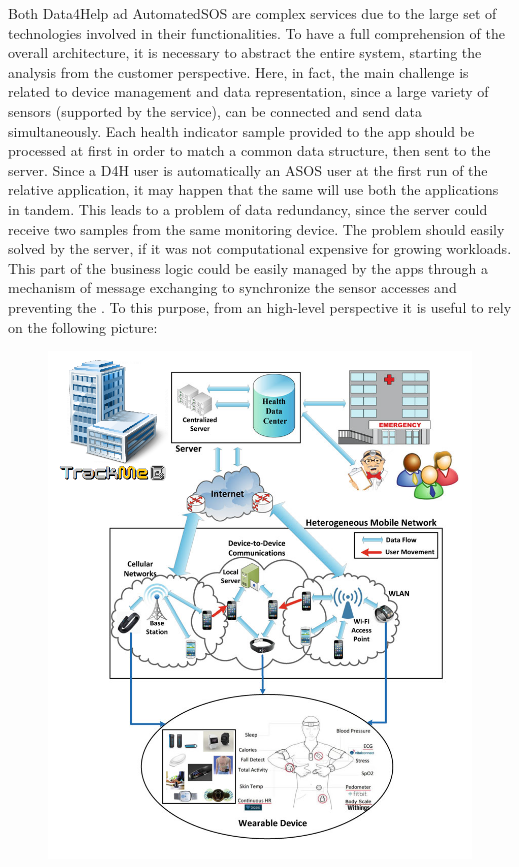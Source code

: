 

\begin{flushleft}

	
{}
Both Data4Help ad AutomatedSOS are complex services due to the large set of technologies involved in their functionalities. To have a full comprehension of the overall architecture, it is necessary to abstract the entire system, starting the analysis from the customer perspective. Here, in fact, the main challenge is related to device management and data representation, since a large variety of sensors (supported by the service), can be connected and send data simultaneously. Each health indicator sample provided to the app should be processed at first in order to match a common data structure, then sent to the server. Since a D4H user is automatically an ASOS user at the first run of the relative application, it may happen that the same will use both the applications in tandem. This leads to a problem of data redundancy, since the server could receive two samples from the same monitoring device. The problem should easily solved by the server, if it was not computational expensive for growing workloads. This part of the business logic could be easily managed by the apps through a mechanism of message exchanging to synchronize the sensor accesses and preventing the .   To this purpose, from an high-level perspective it is useful to rely on the following picture:

\begin{figure}[H]
	\centering
	\includegraphics[scale=0.7]{images/system_perspective}
	\caption{}
\end{figure}



\end{flushleft}
